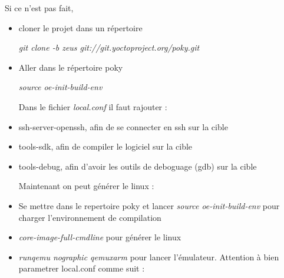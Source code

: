 Si ce n'est pas fait,
\begin{itemize}
\item 
 cloner le projet dans un répertoire


\textit{git clone -b zeus git://git.yoctoproject.org/poky.git}

\item 
Aller dans le répertoire poky

\textit{source oe-init-build-env}

Dans le fichier \textit{local.conf} il faut rajouter : 

\item ssh-server-openssh, afin de se connecter en ssh sur la cible
\item tools-sdk, afin de compiler le logiciel sur la cible
\item tools-debug, afin d'avoir les outils de deboguage (gdb) sur la cible




Maintenant on peut générer le linux : 
\item 
Se mettre dans le repertoire poky et lancer \textit{source oe-init-build-env} pour charger l'environnement de compilation

\item 
\textit{core-image-full-cmdline} pour générer le linux

\item 
\textit{runqemu nographic qemuxarm} pour lancer l'émulateur.
Attention à bien parametrer local.conf comme suit : 
\\




\end{itemize}

